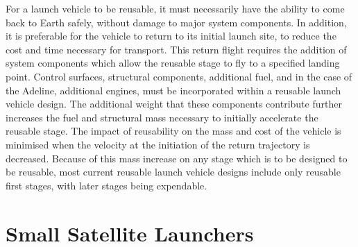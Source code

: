   For a launch vehicle to be reusable, it must necessarily have the ability to come back to Earth safely, without damage to major system components. In addition, it is preferable for the vehicle to return to its initial launch site, to reduce the cost and time necessary for transport. This return flight requires the addition of system components which allow the reusable stage to fly to a specified landing point. Control surfaces\cite{Clark2018}, structural components\cite{Sarigul2003}, additional fuel\cite{Sarigul2003}, and in the case of the Adeline, additional engines\cite{Adeline}, must be incorporated within a reusable launch vehicle design. The additional weight that these components contribute further increases the fuel and structural mass necessary to initially accelerate the reusable stage. The impact of reusability on the mass and cost of the vehicle is minimised when the velocity at the initiation of the return trajectory is decreased. Because of this mass increase on any stage which is to be designed to be reusable, most current reusable launch vehicle designs include only reusable first stages, with later stages being expendable. 
  
  
 

  \section{Small Satellite Launchers}\label{subsec:smallsats}
 
 
 
